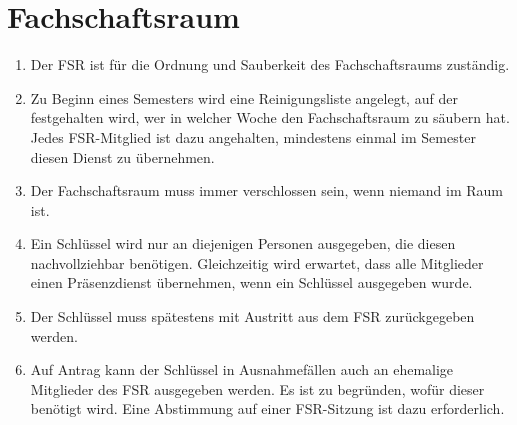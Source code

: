 \section{Fachschaftsraum}
\begin{enumerate}
	\item Der FSR ist für die Ordnung und Sauberkeit des Fachschaftsraums zuständig.
	\item Zu Beginn eines Semesters wird eine Reinigungsliste angelegt, auf der festgehalten wird, wer in welcher Woche den Fachschaftsraum zu säubern hat.
	Jedes FSR-Mitglied ist dazu angehalten, mindestens einmal im Semester diesen Dienst zu übernehmen.
	\item Der Fachschaftsraum muss immer verschlossen sein, wenn niemand im Raum ist.
	\item Ein Schlüssel wird nur an diejenigen Personen ausgegeben, die diesen nachvollziehbar benötigen.
	Gleichzeitig wird erwartet, dass alle Mitglieder einen Präsenzdienst übernehmen, wenn ein Schlüssel ausgegeben wurde.
	\item Der Schlüssel muss spätestens mit Austritt aus dem FSR zurückgegeben werden.
	\item Auf Antrag kann der Schlüssel in Ausnahmefällen auch an ehemalige Mitglieder des FSR ausgegeben werden.
	Es ist zu begründen, wofür dieser benötigt wird.
	Eine Abstimmung auf einer FSR-Sitzung ist dazu erforderlich.
\end{enumerate}


